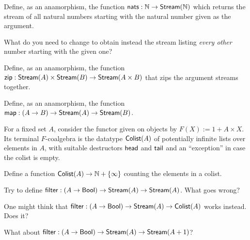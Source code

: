 \begin{exer}\label{exer:stream-of-nats}
  Define, as an anamorphism, the function $\mathsf{nats} : \mathbb{N} \to \mathsf{Stream}(\mathbb{N})$ which returns the stream of all natural
  numbers starting with the natural number given as the argument.

  What do you need to change to obtain instead the stream listing \emph{every other} number starting with the given one?
\end{exer}


\begin{exer}\label{exer:zip}
  Define, as an anamorphism, the function $\mathsf{zip} : \mathsf{Stream}(A) \times \mathsf{Stream}(B) \to \mathsf{Stream}(A \times B)$ that zips the argument streams together.
\end{exer}

\begin{exer}
  Define, as an anamorphism, the function $\mathsf{map} : (A \to B) \to \mathsf{Stream}(A) \to \mathsf{Stream}(B)$.
\end{exer}

\begin{exer}
  For a fixed set $A$, consider the functor given on objects by $F(X) := 1 + A \times X$.
  Its terminal $F$-coalgebra is the datatype $\mathsf{Colist}(A)$ of potentially infinite lists over elements in $A$, with suitable destructors $\mathsf{head}$ and $\mathsf{tail}$ and an ``exception'' in case the colist is empty.

  Define a function $\mathsf{Colist}(A) \to  \mathbb{N} + \{\infty\}$ counting the elements in a colist.  
\end{exer}

\begin{exer}
  Try to define $\mathsf{filter} : (A \to \mathsf{Bool}) \to \mathsf{Stream}(A) \to \mathsf{Stream}(A)$.
  What goes wrong?

  One might think that $\mathsf{filter} : (A \to \mathsf{Bool}) \to \mathsf{Stream}(A) \to \mathsf{Colist}(A)$ works instead.
  Does it?

  What about $\mathsf{filter} : (A \to \mathsf{Bool}) \to \mathsf{Stream}(A) \to \mathsf{Stream}(A+1)$?
  
\end{exer}

